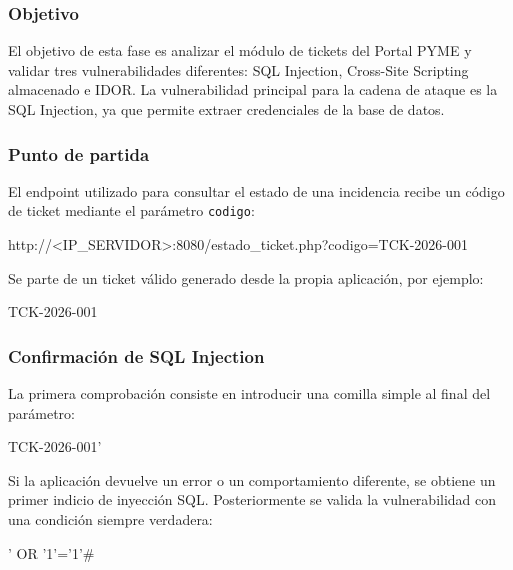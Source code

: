 

\subsubsection*{Objetivo}

El objetivo de esta fase es analizar el módulo de tickets del Portal PYME y validar tres vulnerabilidades diferentes: SQL Injection, Cross-Site Scripting almacenado e IDOR. La vulnerabilidad principal para la cadena de ataque es la SQL Injection, ya que permite extraer credenciales de la base de datos.

\subsubsection*{Punto de partida}

El endpoint utilizado para consultar el estado de una incidencia recibe un código de ticket mediante el parámetro \texttt{codigo}:

\begin{configbox}
http://<IP_SERVIDOR>:8080/estado_ticket.php?codigo=TCK-2026-001
\end{configbox}

Se parte de un ticket válido generado desde la propia aplicación, por ejemplo:

\begin{configbox}
TCK-2026-001
\end{configbox}

\subsubsection*{Confirmación de SQL Injection}

La primera comprobación consiste en introducir una comilla simple al final del parámetro:

\begin{configbox}
TCK-2026-001'
\end{configbox}

Si la aplicación devuelve un error o un comportamiento diferente, se obtiene un primer indicio de inyección SQL. Posteriormente se valida la vulnerabilidad con una condición siempre verdadera:

\begin{configbox}
' OR '1'='1'#
\end{configbox}

